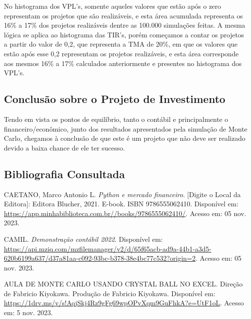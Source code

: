\documentclass[11pt]{article}
\begin{document}
No histograma dos VPL's, somente aqueles valores que estão após o zero representam os projetos que são realizáveis, e esta área acumulada representa os 16\% a 17\% dos projetos realizáveis dentre as 100.000 simulações feitas. A mesma lógica se aplica ao histograma das TIR's, porém começamos a contar os projetos a partir do valor de 0,2, que representa a TMA de 20\%, em que os valores que estão após esse 0,2 representam os projetos realizáveis, e esta área corresponde aos mesmos 16\% a 17\% calculados anteriormente e presentes no histograma dos VPL's.

\subsection{\textbf{Conclusão sobre o Projeto de Investimento}}
Tendo em vista os pontos de equilíbrio, tanto o contábil e principalmente o financeiro/econômico, junto dos resultados apresentados pela simulação de Monte Carlo, chegamos à conclusão de que este é um projeto que não deve ser realizado devido a baixa chance de ele ter sucesso.

\newpage
\begin{thebibliography}{9}
\section{Bibliografia Consultada}
CAETANO, Marco Antonio L. 
\textit{Python e mercado financeiro}. 
[Digite o Local da Editora]: Editora Blucher, 2021. E-book. ISBN 9786555062410. 
Disponível em: \href{https://app.minhabiblioteca.com.br//books/9786555062410/}{https://app.minhabiblioteca.com.br//books/9786555062410/}. 
Acesso em: 05 nov. 2023.

CAMIL. 
\textit{Demonstração contábil 2022}. 
Disponível em: \href{https://api.mziq.com/mzfilemanager/v2/d/65f65acb-ad9a-44b1-a3d5-620b6199a637/d37a81aa-c092-93bc-b378-38e4bc77c532?origin=2}{https://api.mziq.com/mzfilemanager/v2/d/65f65acb-ad9a-44b1-a3d5-620b6199a637/d37a81aa-c092-93bc-b378-38e4bc77c532?origin=2}. 
Acesso em: 05 nov. 2023.

AULA DE MONTE CARLO USANDO CRYSTAL BALL NO EXCEL. 
Direção de Fabricio Kiyokawa. Produção de Fabricio Kiyokawa.
Disponível em: \href{https://1drv.ms/v/s!AqjSkj4Rz9gFg69wpOPvXqm9GuFhkA?e=UtF1oL}{https://1drv.ms/v/s!AqjSkj4Rz9gFg69wpOPvXqm9GuFhkA?e=UtF1oL}. 
Acesso em: 5 nov. 2023.
\end{thebibliography}

\newpage
\appendix
\end{document}
